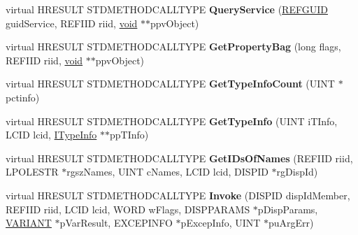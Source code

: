 \begin{DoxyCompactItemize}
\item 
\mbox{\label{class_c_shell_browser_a160cf5d58a1bbbb0a8353e64397615a9}} 
virtual H\+R\+E\+S\+U\+LT S\+T\+D\+M\+E\+T\+H\+O\+D\+C\+A\+L\+L\+T\+Y\+PE {\bfseries Query\+Service} (\hyperlink{struct___g_u_i_d}{R\+E\+F\+G\+U\+ID} guid\+Service, R\+E\+F\+I\+ID riid, \hyperlink{interfacevoid}{void} $\ast$$\ast$ppv\+Object)
\item 
\mbox{\label{class_c_shell_browser_a3f3eb4a2e3239d75e5779bece7f23317}} 
virtual H\+R\+E\+S\+U\+LT S\+T\+D\+M\+E\+T\+H\+O\+D\+C\+A\+L\+L\+T\+Y\+PE {\bfseries Get\+Property\+Bag} (long flags, R\+E\+F\+I\+ID riid, \hyperlink{interfacevoid}{void} $\ast$$\ast$ppv\+Object)
\item 
\mbox{\label{class_c_shell_browser_ab52f2ecface642cc4008876a66b382d1}} 
virtual H\+R\+E\+S\+U\+LT S\+T\+D\+M\+E\+T\+H\+O\+D\+C\+A\+L\+L\+T\+Y\+PE {\bfseries Get\+Type\+Info\+Count} (U\+I\+NT $\ast$pctinfo)
\item 
\mbox{\label{class_c_shell_browser_a076c28d7f3563d7351a8926fb0ff64f7}} 
virtual H\+R\+E\+S\+U\+LT S\+T\+D\+M\+E\+T\+H\+O\+D\+C\+A\+L\+L\+T\+Y\+PE {\bfseries Get\+Type\+Info} (U\+I\+NT i\+T\+Info, L\+C\+ID lcid, \hyperlink{interface_i_type_info}{I\+Type\+Info} $\ast$$\ast$pp\+T\+Info)
\item 
\mbox{\label{class_c_shell_browser_a51c520c856e7fcf2ad2ada00fcadccfb}} 
virtual H\+R\+E\+S\+U\+LT S\+T\+D\+M\+E\+T\+H\+O\+D\+C\+A\+L\+L\+T\+Y\+PE {\bfseries Get\+I\+Ds\+Of\+Names} (R\+E\+F\+I\+ID riid, L\+P\+O\+L\+E\+S\+TR $\ast$rgsz\+Names, U\+I\+NT c\+Names, L\+C\+ID lcid, D\+I\+S\+P\+ID $\ast$rg\+Disp\+Id)
\item 
\mbox{\label{class_c_shell_browser_afd37606c6f0d6679a66007220d6ac13c}} 
virtual H\+R\+E\+S\+U\+LT S\+T\+D\+M\+E\+T\+H\+O\+D\+C\+A\+L\+L\+T\+Y\+PE {\bfseries Invoke} (D\+I\+S\+P\+ID disp\+Id\+Member, R\+E\+F\+I\+ID riid, L\+C\+ID lcid, W\+O\+RD w\+Flags, D\+I\+S\+P\+P\+A\+R\+A\+MS $\ast$p\+Disp\+Params, \hyperlink{structtag_v_a_r_i_a_n_t}{V\+A\+R\+I\+A\+NT} $\ast$p\+Var\+Result, E\+X\+C\+E\+P\+I\+N\+FO $\ast$p\+Excep\+Info, U\+I\+NT $\ast$pu\+Arg\+Err)
\item 
\mbox{\label{class_c_shell_browser_a6a8c5b4137c7535307e63eac112572b0}} 
$$
\end{DoxyCompactItemize}
